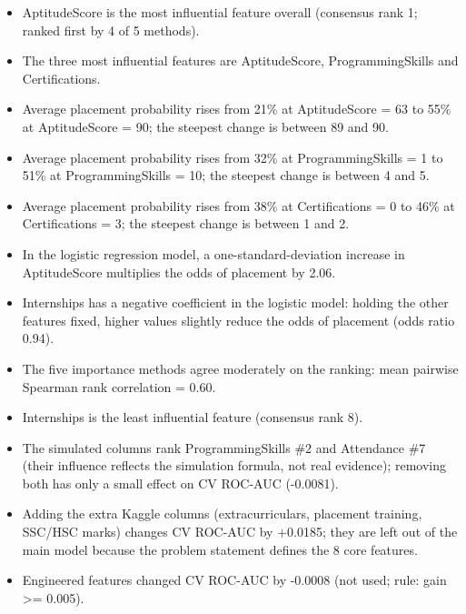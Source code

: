 \begin{itemize}
\item AptitudeScore is the most influential feature overall (consensus rank 1; ranked first by 4 of 5 methods).
\item The three most influential features are AptitudeScore, ProgrammingSkills and Certifications.
\item Average placement probability rises from 21\% at AptitudeScore = 63 to 55\% at AptitudeScore = 90; the steepest change is between 89 and 90.
\item Average placement probability rises from 32\% at ProgrammingSkills = 1 to 51\% at ProgrammingSkills = 10; the steepest change is between 4 and 5.
\item Average placement probability rises from 38\% at Certifications = 0 to 46\% at Certifications = 3; the steepest change is between 1 and 2.
\item In the logistic regression model, a one-standard-deviation increase in AptitudeScore multiplies the odds of placement by 2.06.
\item Internships has a negative coefficient in the logistic model: holding the other features fixed, higher values slightly reduce the odds of placement (odds ratio 0.94).
\item The five importance methods agree moderately on the ranking: mean pairwise Spearman rank correlation = 0.60.
\item Internships is the least influential feature (consensus rank 8).
\item The simulated columns rank ProgrammingSkills \#2 and Attendance \#7 (their influence reflects the simulation formula, not real evidence); removing both has only a small effect on CV ROC-AUC (-0.0081).
\item Adding the extra Kaggle columns (extracurriculars, placement training, SSC/HSC marks) changes CV ROC-AUC by +0.0185; they are left out of the main model because the problem statement defines the 8 core features.
\item Engineered features changed CV ROC-AUC by -0.0008 (not used; rule: gain >= 0.005).
\end{itemize}
